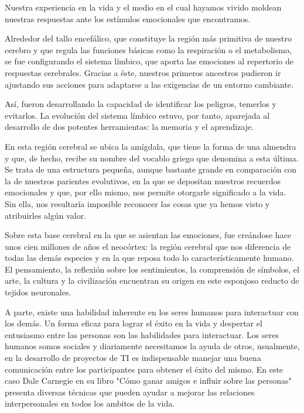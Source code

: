 \documentclass[journal]{IEEEtran}
\begin{document}
Nuestra experiencia en la vida y el medio en el cual hayamos vivido moldean nuestras respuestas ante los estímulos emocionales que encontramos.

Alrededor del tallo encefálico, que constituye la región más primitiva de nuestro cerebro y que regula las funciones básicas como la respiración o el metabolismo, se fue configurando el sistema límbico, que aporta las emociones al repertorio de respuestas cerebrales. Gracias a éste, nuestros primeros ancestros pudieron ir ajustando sus acciones para adaptarse a las exigencias de un entorno cambiante.

Así, fueron desarrollando la capacidad de identificar los peligros, temerlos y evitarlos. La evolución del sistema límbico estuvo, por tanto, aparejada al desarrollo de dos potentes herramientas: la memoria y el aprendizaje.

En esta región cerebral se ubica la amígdala, que tiene la forma de una almendra y que, de hecho, recibe su nombre del vocablo griego que denomina a esta última. Se trata de una estructura pequeña, aunque bastante grande en comparación con la de nuestros parientes evolutivos, en la que se depositan nuestros recuerdos emocionales y que, por ello mismo, nos permite otorgarle significado a la vida. Sin ella, nos resultaría imposible reconocer las cosas que ya hemos visto y atribuirles algún valor.

Sobre esta base cerebral en la que se asientan las emociones, fue creándose hace unos cien millones de años el neocórtex: la región cerebral que nos diferencia de todas las demás especies y en la que reposa todo lo característicamente humano. El pensamiento, la reflexión sobre los sentimientos, la comprensión de símbolos, el arte, la cultura y la civilización encuentran su origen en este esponjoso reducto de tejidos neuronales.

A parte, existe una habilidad inherente en los seres humanos para interactuar con los demás. Un forma eficaz para lograr el éxito en la vida y despertar el entusiasmo entre las personas son las habilidades para interactuar. Los seres humanos somos sociales y diariamente necesitamos la ayuda de otros, usualmente, en la desarrollo de proyectos de TI es indispensable manejar una buena comunicación entre los participantes para obtener el éxito del mismo. En este caso Dale Carnegie en su libro "Cómo ganar amigos e influir sobre las personas" presenta diversas técnicas que pueden ayudar a mejorar las relaciones interpersonales en todos los ambitos de la vida. 
\end{document}
